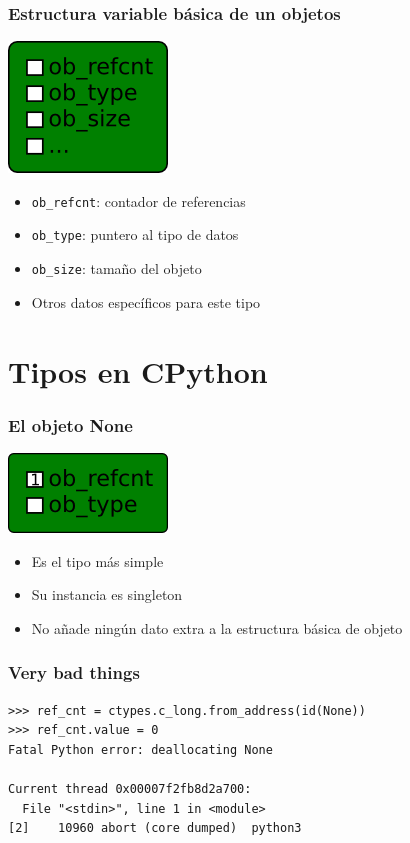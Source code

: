 \documentclass[10pt]{beamer}
\begin{document}
  \begin{frame}[containsverbatim]
    \frametitle{Estructura variable básica de un objetos}
    \begin{center}\includegraphics{img/PyVarObject.png}\end{center}
    \begin{itemize}
      \item \verb+ob_refcnt+: contador de referencias
      \item \verb+ob_type+: puntero al tipo de datos
      \item \verb+ob_size+: tamaño del objeto
      \item Otros datos específicos para este tipo
    \end{itemize}
  \end{frame}

  \section*{Tipos en CPython}

  \begin{frame}[containsverbatim]
    \frametitle{El objeto None}
    \begin{center}\includegraphics{img/None.png}\end{center}
    \begin{itemize}
      \item Es el tipo más simple
      \item Su instancia es singleton
      \item No añade ningún dato extra a la estructura básica de objeto
    \end{itemize}
  \end{frame}

  \begin{frame}[containsverbatim]
    \frametitle{Very bad things}
    \begin{verbatim}
>>> ref_cnt = ctypes.c_long.from_address(id(None))
>>> ref_cnt.value = 0
Fatal Python error: deallocating None

Current thread 0x00007f2fb8d2a700:
  File "<stdin>", line 1 in <module>
[2]    10960 abort (core dumped)  python3
    \end{verbatim}
  \end{frame}
\end{document}

